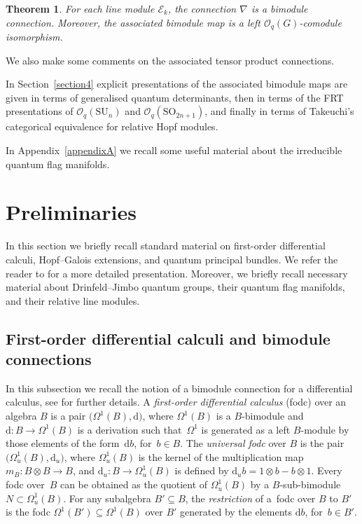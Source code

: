 \documentclass[10pt,a4paper]{amsart}
\numberwithin{equation}{section}
\newtheorem{Theorem}{Theorem}[section]
\begin{document}
\begin{Theorem}
For each line module $\mathcal{E}_k$, the connection $\nabla$ is a bimodule connection. Moreover, the associated bimodule map is a left $\mathcal{O}_q(G)$-comodule isomorphism.
\end{Theorem}

We also make some comments on the associated tensor product connections.

In Section~\ref{section4} explicit presentations of the associated bimodule maps are given in terms of generalised quantum determinants, then in terms of the FRT presentations of $\mathcal{O}_q(\mathrm{SU}_n)$ and $\mathcal{O}_q(\mathrm{SO}_{2n+1})$, and finally in terms of Takeuchi's categorical equivalence for relative Hopf modules.

In Appendix~\ref{appendixA} we recall some useful material about the irreducible quantum flag manifolds.


\section{Preliminaries}\label{section2}

In this section we briefly recall standard material on first-order differential calculi, Hopf--Galois extensions, and quantum principal bundles. We refer the reader to \cite{BeggsMajid:Leabh} for a more detailed presentation. Moreover, we briefly recall necessary material about Drinfeld--Jimbo quantum groups, their quantum flag manifolds, and their relative line modules.


\subsection{First-order differential calculi and bimodule connections}\label{section2.1}

In this subsection we recall the notion of a bimodule connection for a differential calculus, see \cite[Section~3.4]{BeggsMajid:Leabh} for further details. A {\em first-order differential calculus} (fodc) over an algebra $B$ is a pair $\big(\Omega^1(B),\mathrm{d}\big)$, where $\Omega^1(B)$ is a $B$-bimodule and $\mathrm{d}\colon B \to \Omega^1(B)$ is a derivation such that~$\Omega^1$ is generated as a left $B$-module by those elements of the form~$\mathrm{d} b$, for~$b \in B$.
The {\em universal fodc} over $B$ is the pair $\big(\Omega^1_u(B), \mathrm{d}_u\big)$, where $\Omega^1_u(B)$ is the kernel of the multiplication map $m_B\colon B \otimes B \to B$, and $\mathrm{d}_u\colon B \to \Omega^1_u(B)$ is defined by $\mathrm{d}_u b = 1 \otimes b - b \otimes 1$. Every fodc over~$B$ can be obtained as the quotient of $\Omega^1_u(B)$ by a $B$-sub-bimodule $N\subset \Omega^1_u(B)$. For any subalgebra $B' \subseteq B$, the \emph{restriction} of a~fodc over $B$ to $B'$ is the fodc $\Omega^1(B') \subseteq \Omega^1(B)$ over $B'$ generated by the elements $\mathrm{d}b$, for~$b \in B'$.
\end{document}
